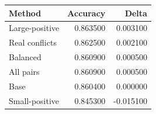 \begin{tabular}{lrr}
\toprule
Method & Accuracy & Delta \\
\midrule
Large-positive & 0.863500 & 0.003100 \\
Real conflicts & 0.862500 & 0.002100 \\
Balanced & 0.860900 & 0.000500 \\
All pairs & 0.860900 & 0.000500 \\
Base & 0.860400 & 0.000000 \\
Small-positive & 0.845300 & -0.015100 \\
\bottomrule
\end{tabular}
